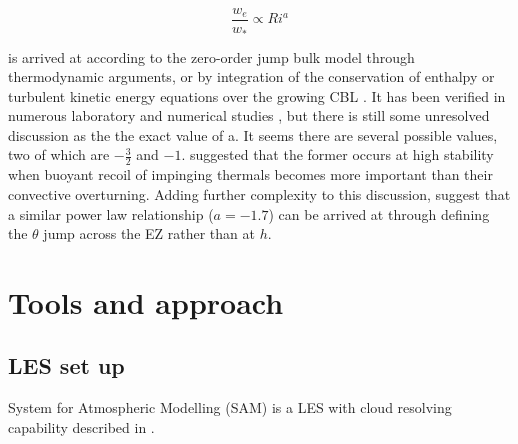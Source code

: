 \begin{equation}\label{eq:ervsri}
\frac{w_{e}}{w_{*}} \propto Ri^{a}
\end{equation}

is arrived at according to the zero-order jump bulk model through thermodynamic arguments, or by integration of the conservation of enthalpy or turbulent kinetic energy equations over the growing CBL \citep{Tennekes73, Deardorff79, FedConzMir04}. It has been verified in numerous laboratory and numerical studies \citep{DearWill80, SullMoengStev, FedConzMir04, BrooksFowler2}, but there is still some unresolved discussion as the the exact value of a.  It seems there are several possible values, two of which are $-\frac{3}{2}$ and $-1$.  \cite{Turner86} suggested that the former occurs at high stability when buoyant recoil of impinging thermals becomes more important than their convective overturning.  Adding further complexity to this discussion, \cite{FedConzMir04} suggest that a similar power law relationship ($a = -1.7$) can be arrived at through defining the $\theta$ jump across the EZ rather than at $h$.\\

\section{Tools and approach}

\subsection{LES set up}

System for Atmospheric Modelling (SAM) is a LES with cloud resolving capability described in \cite{KhairRand}.

